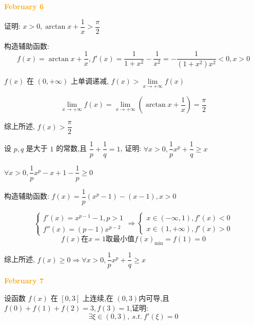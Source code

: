 \textcolor{orange}{\textbf{February 6}}

\begin{example}[][Exam: 28.1.11]
	证明: $x > 0,\arctan x+\dfrac{1}{x}>\dfrac{\pi}{2}$
\end{example}
\begin{solution}

	构造辅助函数: 
	$$f(x) = \arctan x +\dfrac{1}{x}, f'(x) = \dfrac{1}{1+x^{2}}-\dfrac{1}{x^{2}} = -\dfrac{1}{(1+x^{2})x^{2}} < 0, x>0$$

	$f(x)$ 在 $(0,+\infty)$ 上单调递减, $f(x) > \lim\limits_{x\to +\infty}f(x)$

	$$\lim\limits_{x\to +\infty}f(x) = \lim\limits_{x\to +\infty}(\arctan x +\dfrac{1}{x}) =\dfrac{\pi}{2}$$

	综上所述, $f(x) > \dfrac{\pi}{2}$
\end{solution}

\begin{example}[][Exam: 28.1.12]
	设 $p,q$ 是大于 $1$ 的常数,且 $\dfrac{1}{p}+\dfrac{1}{q}=1$,
	证明: $\forall x>0, \dfrac{1}{p}x^{p}+\dfrac{1}{q}\geq x$
\end{example}

\begin{solution}

	$\forall x > 0, \dfrac{1}{p}x^{p} -x +1-\dfrac{1}{p} \geq 0$
	
	构造辅助函数: $f(x) = \dfrac{1}{p}(x^{p}-1) - (x-1), x > 0$

	$$\begin{cases}
		f'(x) = x^{p-1}-1, p > 1\\
		f''(x) = (p-1)x^{p-2}
	\end{cases}\Rightarrow 
	\begin{cases}
		x\in (-\infty,1), f'(x) < 0\\
		x\in(1,+\infty), f'(x) > 0
	\end{cases}$$
	$$f(x)\text{在} x=1\text{取最小值} f(x)_{\min} = f(1) =0$$

	综上所述, $f(x)\geq 0\Rightarrow \forall x > 0, \dfrac{1}{p}x^{p}+\dfrac{1}{q}\geq x$
\end{solution}

\textcolor{orange}{\textbf{February 7}}

\begin{example}[][Exam: 28.1.13]
	设函数 $f(x)$ 在 $[0,3]$ 上连续,在 $(0,3)$内可导,且 $f(0)+f(1)+f(2)=3,f(3)=1$,证明: $$\exists \xi\in(0,3),\ s.t.\ f'(\xi)=0$$
\end{example}
 
